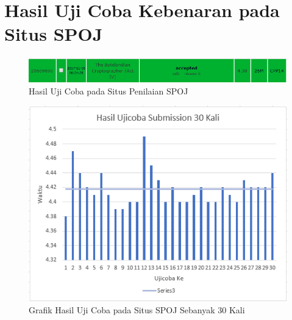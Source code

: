 
 \chapter{Hasil Uji Coba Kebenaran pada Situs SPOJ}
   
   \begin{figure}[H]
   \centering
  	\includegraphics[scale=0.53]{images/lampiran/best.png}
  	\caption{Hasil Uji Coba pada Situs Penilaian SPOJ}
  	\label{fig:best_submission}
  	\end{figure}
	
	 \begin{figure}[H]
  \centering
  	 \includegraphics[scale=0.7]{images/lampiran/uji31.png}
  	\caption{Grafik Hasil Uji Coba pada Situs SPOJ Sebanyak 30 Kali}
  	\label{fig:chart}
  \end{figure}  	
  	
